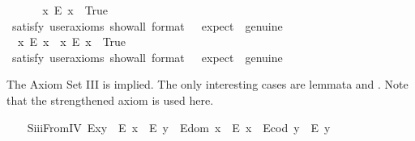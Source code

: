 \begin{isabellebody}
\ %
\endisadelimproof
%
\isatagproof
{}\isamarkupfalse%
%
\endisatagproof
{\isafoldproof}%
%
\isadelimproof
%
\endisadelimproof
\isanewline
\ \ \isamarkupfalse%
\ \ {\isachardoublequoteopen}{\isasymexists}x{\isachardot}\ \isactrlbold {\isasymnot}{\isacharparenleft}E\ x{\isacharparenright}{\isachardoublequoteclose}\ \ True\ \ %
\ \ \isanewline
\ \ \ \ \isamarkupfalse%
\ {\isacharbrackleft}satisfy{\isacharcomma}\ user{\isacharunderscore}axioms{\isacharcomma}\ show{\isacharunderscore}all{\isacharcomma}\ format\ {\isacharequal}\ {}{\isacharcomma}\ expect\ {\isacharequal}\ genuine{\isacharbrackright}%
\isadelimproof
\ %
\endisadelimproof
%
\isatagproof
{}\isamarkupfalse%
%
\endisatagproof
{\isafoldproof}%
%
\isadelimproof
%
\endisadelimproof
\ \isanewline
\ \ \isamarkupfalse%
\ \ {\isachardoublequoteopen}{\isacharparenleft}{\isasymexists}x{\isachardot}\ \isactrlbold {\isasymnot}{\isacharparenleft}E\ x{\isacharparenright}{\isacharparenright}\ {\isasymand}\ {\isacharparenleft}{\isasymexists}x{\isachardot}\ {\isacharparenleft}E\ x{\isacharparenright}{\isacharparenright}{\isachardoublequoteclose}\ \ True\ \ %
\ \isanewline
\ \ \ \ \isamarkupfalse%
\ {\isacharbrackleft}satisfy{\isacharcomma}\ user{\isacharunderscore}axioms{\isacharcomma}\ show{\isacharunderscore}all{\isacharcomma}\ format\ {\isacharequal}\ {}{\isacharcomma}\ expect\ {\isacharequal}\ genuine{\isacharbrackright}%
\isadelimproof
\ %
\endisadelimproof
%
\isatagproof
{}\isamarkupfalse%
%
\endisatagproof
{\isafoldproof}%
%
\isadelimproof
%
\endisadelimproof
%
\begin{isamarkuptext}%
The Axiom Set III is implied. The only interesting cases are 
 lemmata  and . Note that the strengthened 
 axiom  is used here.%
\end{isamarkuptext}\isamarkuptrue%
\ \ \isamarkupfalse%
\ S\isactrlsub i\isactrlsub i\isactrlsub iFromIV{\isacharcolon}\ {\isachardoublequoteopen}{\isacharparenleft}E{\isacharparenleft}x{\isasymcdot}y{\isacharparenright}\ \isactrlbold {\isasymrightarrow}\ {\isacharparenleft}E\ x\ \isactrlbold {\isasymand}\ E\ y{\isacharparenright}{\isacharparenright}\ \isactrlbold {\isasymand}\ {\isacharparenleft}E{\isacharparenleft}dom\ x{\isacharparenright}\ \isactrlbold {\isasymrightarrow}\ E\ x{\isacharparenright}\ \isactrlbold {\isasymand}\ {\isacharparenleft}E{\isacharparenleft}cod\ y{\isacharparenright}\ \isactrlbold {\isasymrightarrow}\ E\ y{\isacharparenright}{\isachardoublequoteclose}\ \ \isanewline

\end{isabellebody}
